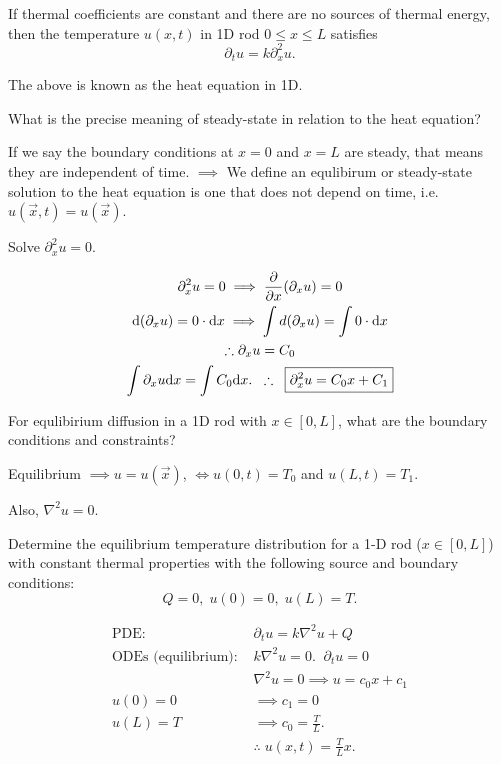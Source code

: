 \begin{quest}
	\item \cloze If thermal coefficients are constant and there are no sources of thermal energy, then the temperature $u(x, t)$ in 1D rod $0\leq x \leq L$ satisfies \[ \partial_t u = k \partial_x^2 u .\]

	\item \cloze The above is known as the heat equation in 1D.

	\item What is the precise meaning of steady-state in relation to the heat equation?
	\begin{ans}
		If we say the boundary conditions at $x=0$ and $x=L$ are steady, that means they are independent of time. $\implies$ We define an equlibirum or steady-state solution to the heat equation is one that does not depend on time, i.e. $u(\vec{x}, t) = u(\vec{x})$.  
	\end{ans}

	\item Solve $\partial_x^2 u = 0$.
	\begin{ans}
		\begin{gather*}
			\partial_x^2 u = 0 
				\implies  \frac{\partial}{\partial x} (\partial_x u) = 0  \\
			\text{d}(\partial_x u) = 0\cdot \text{d} x \implies
				\int d (\partial_x u) = \int 0 \cdot \text{d} x \\
			\therefore \partial_x u = C_0 \\ 
			\int \partial_x u \text{d} x = \int C_0 \text{d} x. \;\;
				\therefore\;\; \boxed{ \partial_x^2 u = C_0 x + C_1 } 
		\end{gather*}
	\end{ans}

	\item For equlibirium diffusion in a 1D rod with $x\in [0, L]$, what are the boundary conditions and  constraints?
	\begin{ans}
		Equilibrium $\implies u = u(\vec{x})$, $\iff u(0,t) = T_0 $ and $u(L, t) = T_1$. 
		
		Also, $\nabla^2 u = 0$.
	\end{ans}

	\item Determine the equilibrium temperature distribution for a 1-D rod ($x\in[0, L]$) with constant thermal properties with the following source and boundary conditions: 
	\[ Q = 0, \; u(0) = 0, \; u(L) = T .\]
	\begin{ans}
		\begin{align*}
			\text{PDE: }
				&\partial_t u = k\nabla^2 u + Q \tag{heat eq}\\
			\text{ODEs (equilibrium): }
				& k\nabla^2 u = 0.\;\; \partial_t u = 0 \\
				& \nabla^2 u = 0 \implies u = c_0 x + c_1 \\
			u(0) = 0 & 
				\implies c_1 = 0 \\
			u(L) = T &
				\implies c_0 = \frac{T}{L}. \\
			& \therefore \; \boxed{ u(x, t) = \frac{T}{L}x }.  
		\end{align*}
	\end{ans}

	\item 
\end{quest}


